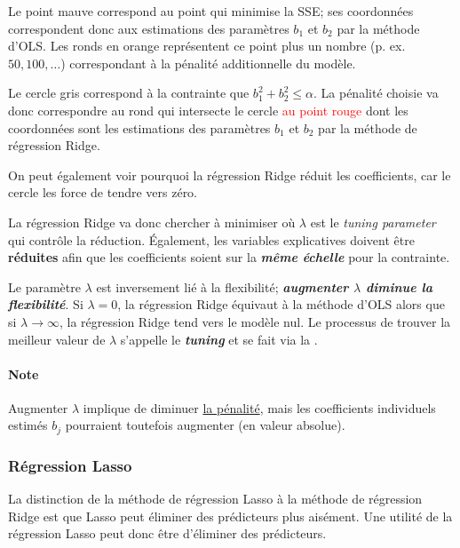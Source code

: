 \documentclass[french]{article}
\begin{document}
\begin{multicols*}{2}
\begin{definitionNOHFILL}
\begin{definitionNOHFILLsub}[Visualisation pour $p = 2$]
\textcolor{amethyst}{Le point mauve} correspond au point qui minimise la SSE; ses coordonnées correspondent donc aux estimations des paramètres $b_{1}$ et $b_{2}$ par la méthode d'OLS. \textcolor{burntorange}{Les ronds en orange} représentent ce point plus un nombre (p. ex. $50, 100, \dots$) correspondant à la pénalité additionnelle du modèle.

\bigskip

\textcolor{ashgrey!80!black}{Le cercle gris} correspond à la contrainte que $b^{2}_{1} + b^{2}_{2} \leq \alpha$. La pénalité choisie va donc correspondre au rond qui intersecte le cercle \textcolor{red}{au point rouge} dont les coordonnées sont les estimations des paramètres $b_{1}$ et $b_{2}$ par la méthode de régression Ridge. 

\bigskip

On peut également voir pourquoi la régression Ridge réduit les coefficients, car le cercle les force de tendre vers zéro.
\end{definitionNOHFILLsub}

La régression Ridge va donc chercher à minimiser  où $\lambda$ est le \og \textit{tuning parameter} \fg{} qui contrôle la réduction. Également, les variables explicatives doivent être \textbf{réduites} afin que les coefficients soient sur la \textbf{\textit{même échelle}} pour la contrainte.
\end{definitionNOHFILL}

Le paramètre $\lambda$ est inversement lié à la flexibilité; \textbf{\textit{augmenter $\lambda$ diminue la flexibilité}}. Si $\lambda = 0$, la régression Ridge équivaut à la méthode d'OLS alors que si $\lambda \rightarrow \infty$, la régression Ridge tend vers le modèle nul. Le processus de trouver la meilleur valeur de $\lambda$ s'appelle le \og \textit{\textbf{tuning}} \fg{} et se fait via la \textit{\underline{}}.

\paragraph{Note}	Augmenter $\lambda$ implique de diminuer \underline{la pénalité}, mais les coefficients individuels estimés $b_{j}$ pourraient toutefois augmenter (en valeur absolue).



\subsubsection{Régression Lasso}
\begin{rappel_enhanced}[Contexte]
La distinction de la méthode de régression Lasso à la méthode de régression Ridge est que Lasso peut éliminer des prédicteurs plus aisément. Une utilité de la régression Lasso peut donc être d'éliminer des prédicteurs.
\end{rappel_enhanced}



\end{multicols*}
\end{document}
